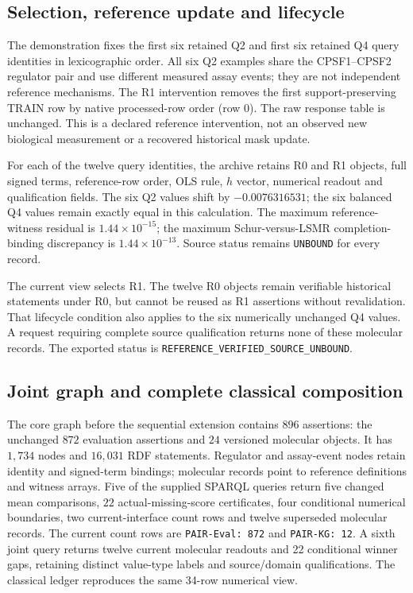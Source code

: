 \subsection{Selection, reference update and lifecycle}
The demonstration fixes the first six retained Q2 and first six retained Q4 query identities in lexicographic order. All six Q2 examples share the CPSF1--CPSF2 regulator pair and use different measured assay events; they are not independent reference mechanisms. The R1 intervention removes the first support-preserving TRAIN row by native processed-row order (row $0$). The raw response table is unchanged. This is a declared reference intervention, not an observed new biological measurement or a recovered historical mask update.

For each of the twelve query identities, the archive retains R0 and R1 objects, full signed terms, reference-row order, OLS rule, $h$ vector, numerical readout and qualification fields. The six Q2 values shift by $-0.0076316531$; the six balanced Q4 values remain exactly equal in this calculation. The maximum reference-witness residual is $1.44\times10^{-15}$; the maximum Schur-versus-LSMR completion-binding discrepancy is $1.44\times10^{-13}$. Source status remains \texttt{UNBOUND} for every record.

The current view selects R1. The twelve R0 objects remain verifiable historical statements under R0, but cannot be reused as R1 assertions without revalidation. That lifecycle condition also applies to the six numerically unchanged Q4 values. A request requiring complete source qualification returns none of these molecular records. The exported status is \texttt{REFERENCE\_VERIFIED\_SOURCE\_UNBOUND}.

\subsection{Joint graph and complete classical composition}
The core graph before the sequential extension contains $896$ assertions: the unchanged $872$ evaluation assertions and $24$ versioned molecular objects. It has $1{,}734$ nodes and $16{,}031$ RDF statements. Regulator and assay-event nodes retain identity and signed-term bindings; molecular records point to reference definitions and witness arrays. Five of the supplied SPARQL queries return five changed mean comparisons, $22$ actual-missing-score certificates, four conditional numerical boundaries, two current-interface count rows and twelve superseded molecular records. The current count rows are \texttt{PAIR-Eval: 872} and \texttt{PAIR-KG: 12}. A sixth joint query returns twelve current molecular readouts and 22 conditional winner gaps, retaining distinct value-type labels and source/domain qualifications. The classical ledger reproduces the same 34-row numerical view.

